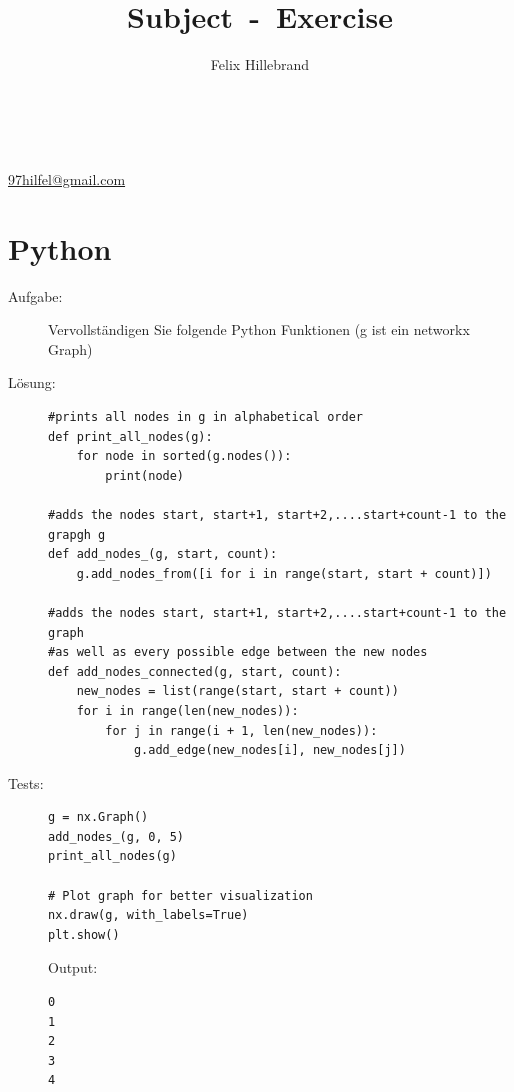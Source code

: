 \documentclass[a4paper,11pt]{report}
\author{Felix Hillebrand}
\makeatletter
\newcommand{\coverpage}{
    \thispagestyle{cover}
    \begin{center}
        {\LARGE \thetitle}\\[0.5cm]
        {\large \theauthor}\\
        \href{mailto:97hilfel@gmail.com}{97hilfel@gmail.com}\\
    \end{center}
    \tableofcontents
    \clearpage
}
\makeatother
\begin{document}

\title{Subject~-~Exercise}
\coverpage

\clearpage
{}
\pagestyle{main}

\chapter{Python}
    \begin{description}
        \item[Aufgabe:] Vervollständigen Sie folgende Python Funktionen (g ist ein networkx Graph) \hfill
        \item[Lösung:] \hfill \newline %
            \begin{verbatim}
#prints all nodes in g in alphabetical order 
def print_all_nodes(g):
    for node in sorted(g.nodes()):
        print(node)

#adds the nodes start, start+1, start+2,....start+count-1 to the grapgh g 
def add_nodes_(g, start, count):
    g.add_nodes_from([i for i in range(start, start + count)])

#adds the nodes start, start+1, start+2,....start+count-1 to the graph 
#as well as every possible edge between the new nodes 
def add_nodes_connected(g, start, count):
    new_nodes = list(range(start, start + count))
    for i in range(len(new_nodes)):
        for j in range(i + 1, len(new_nodes)):
            g.add_edge(new_nodes[i], new_nodes[j])
            \end{verbatim}

        \item[Tests:] \hfil \newline
        \begin{verbatim}
g = nx.Graph()
add_nodes_(g, 0, 5)
print_all_nodes(g)

# Plot graph for better visualization
nx.draw(g, with_labels=True)
plt.show()
        \end{verbatim}
        Output: 
        \begin{verbatim}
0
1
2
3
4
        \end{verbatim}


\end{description}
\end{document}
